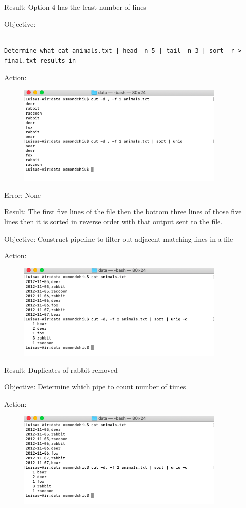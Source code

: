 \documentclass{article}
\begin{document}
Result: Option 4 has the least number of lines

Objective: \begin{verbatim}
 
Determine what cat animals.txt | head -n 5 | tail -n 3 | sort -r > final.txt results in\end{verbatim}\par
Action:\par
\begin{figure}[htp]
    \centering
    \includegraphics[width=10cm]{Screenshot11.png}
    \label{fig:ls-11}
\end{figure}
Error: None \par

Result: The first five lines of the file then the bottom three lines of those five lines then it is sorted in reverse order with that output sent to the file.\par

Objective: Construct pipeline to filter out adjacent matching lines in a file

Action:\par
\begin{figure}[htp]
    \centering
    \includegraphics[width=10cm]{Screenshot12.png}
    \label{fig:ls-12}
\end{figure}

Result: Duplicates of rabbit removed

Objective: Determine which pipe to count number of times

Action:\par
\begin{figure}[htp]
    \centering
    \includegraphics[width=10cm]{Screenshot13.png}
    \label{fig:ls-13}
\end{figure}
\end{document}
